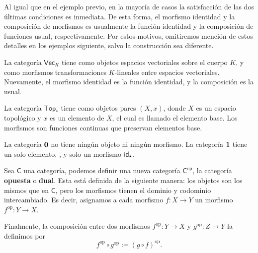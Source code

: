 \documentclass[../main.tex]{subfiles}
\begin{document}
Al igual que en el ejemplo previo, en la mayor\'ia de casos la satisfacci\'on de las dos \'ultimas condiciones es inmediata. De esta forma, el morfismo identidad y la composici\'on de morfismos es usualmente la funci\'on identidad y la composici\'on de funciones usual, respectivamente.
Por estos motivos, omitiremos menci\'on de estos detalles en los ejemplos siguiente, salvo la construcci\'on sea diferente.

\begin{exampleap}
    La categor\'ia $\mathsf{Vec}_K$ tiene como objetos espacios vectoriales sobre el cuerpo $K$, y como morfismos transformaciones $K$-lineales entre espacios vectoriales. Nuevamente, el morfismo identidad es la funci\'on identidad, y la composici\'on es la usual.
\end{exampleap}

\begin{exampleap}
    La categor\'ia $\mathsf{Top}_*$ tiene como objetos pares $(X,x)$, donde $X$ es un espacio topol\'ogico y $x$ es un elemento de $X$, el cual es llamado el elemento base. Los morfismos son funciones continuas que preservan elementos base.
\end{exampleap}

\begin{exampleap}
    La categor\'ia $\emptyt$ no tiene ning\'un objeto ni ning\'un morfismo. La categor\'ia $\unit$ tiene un solo elemento, \star, y solo un morfismo $\idfunc[\star]$.
\end{exampleap}

\begin{exampleap}
    Sea $\mathsf{C}$ una categor\'ia, podemos definir una nueva categor\'ia $\mathsf{C}^{\text{op}}$, la categor\'ia \textbf{opuesta} o \textbf{dual}. Esta est\'a definida de la siguiente manera: los objetos son los mismos que en $\mathsf{C}$, pero los morfismos tienen el dominio y codominio intercambiado. Es decir, asignamos a cada morfismo $f:X \to Y$ un morfismo $f^{\text{op}}:Y \to X$.

    Finalmente, la composici\'on entre dos morfismos $f^{\text{op}}:Y \to X$ y $g^{\text{op}}:Z \to Y$ la definimos por
    \[ f^{\text{op}} \circ g^{\text{op}} := (g\circ f)^{\text{op}}. \]
\end{exampleap}
\end{document}
